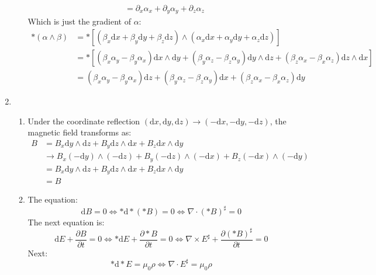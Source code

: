 \documentclass[12pt,a4]{article}
\newcommand{\e}{\mathrm{d}}
\begin{document}
\begin{enumerate}
\begin{enumerate}
\begin{align*}
                      &= \partial_x \alpha_x + \partial_y \alpha_y + \partial_z \alpha_z
        \end{align*}
        Which is just the gradient of $\alpha$:
        \begin{align*}
          * (\alpha \wedge \beta)
                      &= *\left[(\beta_x \e x + \beta_y \e y + \beta_z \e z) \wedge (\alpha_x \e x + \alpha_y \e y + \alpha_z \e z)\right]\\
                      &= *\left[(\beta_x\alpha_y - \beta_y\alpha_x) \e x \wedge \e y + (\beta_y \alpha_z - \beta_z \alpha_y)\e y \wedge \e z + (\beta_z \alpha_x - \beta_x \alpha_z)\e z \wedge \e x \right]\\
                      &= (\beta_x\alpha_y - \beta_y\alpha_x) \e z + (\beta_y \alpha_z - \beta_z \alpha_y)\e x + (\beta_z \alpha_x - \beta_x \alpha_z)\e y
        \end{align*}
    \end{enumerate}
  \item
    \begin{enumerate}
      \item
        Under the coordinate reflection $(\e x, \e y, \e z) \to (- \e x, -\e y, -\e z)$, the magnetic field transforms as:
        \begin{align*}
          B &= B_x \e y \wedge \e z + B_y \e z \wedge \e x + B_z \e x \wedge \e y \\
            &\to  B_x (- \e y) \wedge ( - \e z) + B_y (-\e z) \wedge (- \e x) + B_z (- \e x) \wedge (-\e y)\\
            &=  B_x \e y \wedge \e z + B_y \e z \wedge \e x + B_z \e x \wedge \e y\\
            &=  B
        \end{align*}
      \item
        The equation:
        \begin{equation*}
          \e B = 0 \Leftrightarrow * \e * (*B) = 0 \Leftrightarrow \nabla \cdot (* B)^\sharp = 0
        \end{equation*}
        The next equation is:
        \begin{equation*}
          \e E + \frac{\partial B}{\partial t} = 0 \Leftrightarrow * \e E +  \frac{\partial * B}{\partial t} = 0 \Leftrightarrow  \nabla \times E^\sharp + \frac{\partial (* B)^\sharp}{\partial t} = 0
        \end{equation*}
        Next:
        \begin{equation*}
          * \e * E = \mu_0 \rho \Leftrightarrow  \nabla \cdot E^\sharp = \mu_0 \rho

\end{equation*}
\end{enumerate}
\end{enumerate}
\end{document}
